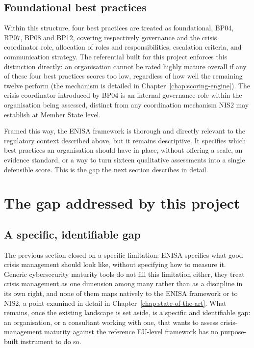\subsection{Foundational best practices}

Within this structure, four best practices are treated as foundational,
BP04, BP07, BP08 and BP12, covering respectively governance and the crisis
coordinator role, allocation of roles and responsibilities, escalation
criteria, and communication strategy. The referential built for this
project enforces this distinction directly: an organisation cannot be rated
highly mature overall if any of these four best practices scores too low,
regardless of how well the remaining twelve perform (the mechanism is
detailed in Chapter~\ref{chap:scoring-engine}).
The crisis coordinator introduced by BP04 is an internal governance role
within the organisation being assessed, distinct from any coordination
mechanism NIS2 may establish at Member State level.

Framed this way, the ENISA framework is thorough and directly relevant to
the regulatory context described above, but it remains descriptive. It
specifies which best practices an organisation should have in place,
without offering a scale, an evidence standard, or a way to turn sixteen
qualitative assessments into a single defensible score. This is the gap the
next section describes in detail.

\section{The gap addressed by this project}
\label{sec:gap}

\subsection{A specific, identifiable gap}

The previous section closed on a specific limitation: ENISA specifies what
good crisis management should look like, without specifying how to measure
it. Generic cybersecurity maturity tools do not fill this limitation
either, they treat crisis management as one dimension among many rather
than as a discipline in its own right, and none of them maps natively to
the ENISA framework or to NIS2, a point examined in detail in
Chapter~\ref{chap:state-of-the-art}. What remains, once the existing landscape is
set aside, is a specific and identifiable gap: an organisation, or a
consultant working with one, that wants to assess crisis-management
maturity against the reference EU-level framework has no purpose-built
instrument to do so.

